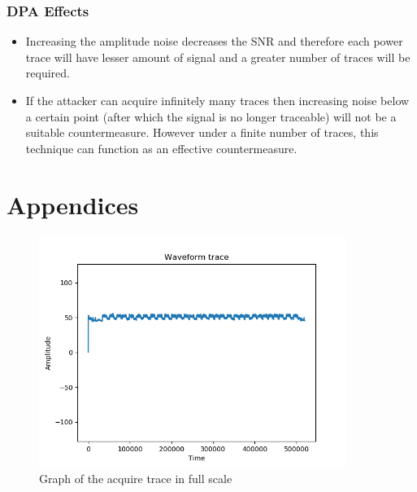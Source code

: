 \documentclass[1p,16pt]{elsarticle}
\begin{document}
\subsubsection{DPA Effects}%
\label{ssub:dpa_effects}
\begin{itemize}
	\item Increasing the amplitude noise decreases the SNR and therefore each power trace
		will have lesser amount of signal and a greater number of traces will be required.
	\item If the attacker can acquire infinitely many traces then increasing noise below a certain
		point (after which the signal is no longer traceable)
		will not be a suitable countermeasure. However under a finite number of traces,
		this technique can function as an effective countermeasure.
\end{itemize}




% 
% 
%
\newpage
\section{Appendices}%
\label{sec:appendices}


\begin{figure}[hb]
	\centering
    \centerline{\includegraphics[width=10cm]{trace_plot}}
    \caption{Graph of the acquire trace in full scale}\label{fig:acquired_trace}
\end{figure}
\end{document}
